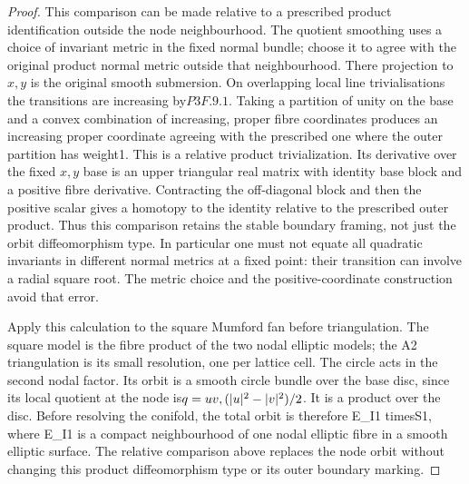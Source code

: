 \begin{proof}
This comparison can be made relative to a prescribed product identification outside the node neighbourhood. The quotient smoothing uses a choice of invariant metric in the fixed normal bundle; choose it to agree with the original product normal metric outside that neighbourhood. There projection to\(x,y\) is the original smooth submersion. On overlapping local line trivialisations the transitions are increasing by\(P3F.9.1\). Taking a partition of unity on the base and a convex combination of increasing, proper fibre coordinates produces an increasing proper coordinate agreeing with the prescribed one where the outer partition has weight1. This is a relative product trivialization. Its derivative over the fixed \(x,y\) base is an upper triangular real matrix with identity base block and a positive fibre derivative. Contracting the off-diagonal block and then the positive scalar gives a homotopy to the identity relative to the prescribed outer product. Thus this comparison retains the stable boundary framing, not just the orbit diffeomorphism type. In particular one must not equate all quadratic invariants in different normal metrics at a fixed point: their transition can involve a radial square root. The metric choice and the positive-coordinate construction avoid that error.

Apply this calculation to the square Mumford fan before triangulation. The square model is the fibre product of the two nodal elliptic models; the A2 triangulation is its small resolution, one per lattice cell. The circle acts in the second nodal factor. Its orbit is a smooth circle bundle over the base disc, since its local quotient at the node is\(q=uv,(|u|\textsuperscript{2}-|v|\textsuperscript{2})/2\). It is a product over the disc. Before resolving the conifold, the total orbit is therefore E\_I1 timesS1, where E\_I1 is a compact neighbourhood of one nodal elliptic fibre in a smooth elliptic surface. The relative comparison above replaces the node orbit without changing this product diffeomorphism type or its outer boundary marking.


\end{proof}

